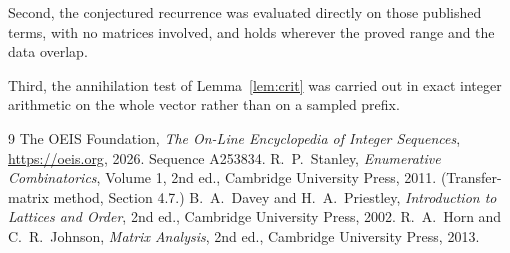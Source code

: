 \documentclass[11pt,a4paper]{article}
\theoremstyle{plain}
\theoremstyle{definition}
\begin{document}
Second, the conjectured recurrence was evaluated directly on those published terms, with no
matrices involved, and holds wherever the proved range and the data overlap.

Third, the annihilation test of Lemma~\ref{lem:crit} was carried out in exact integer
arithmetic on the whole vector rather than on a sampled prefix.

\begin{thebibliography}{9}
 The OEIS Foundation, \emph{The On-Line Encyclopedia of Integer
Sequences}, \url{https://oeis.org}, 2026. Sequence A253834.
 R.~P.~Stanley, \emph{Enumerative Combinatorics}, Volume 1, 2nd ed.,
Cambridge University Press, 2011. (Transfer-matrix method, Section 4.7.)
 B.~A.~Davey and H.~A.~Priestley, \emph{Introduction to Lattices and
Order}, 2nd ed., Cambridge University Press, 2002.
 R.~A.~Horn and C.~R.~Johnson, \emph{Matrix Analysis}, 2nd ed., Cambridge
University Press, 2013.
\end{thebibliography}
\end{document}
